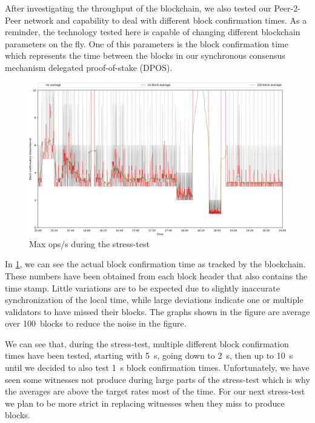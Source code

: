 After investigating the throughput of the blockchain, we also tested our
Peer-2-Peer network and capability to deal with different block confirmation
times. As a reminder, the technology tested here is capable of changing
different blockchain parameters on the fly. One of this parameters is the block
confirmation time which represents the time between the blocks in our
synchronous consensus mechanism delegated proof-of-stake (DPOS).

\begin{figure}[!htp]
 \centering
 \includegraphics[width=\linewidth]{figures/stress-test-block-time-full.png}
 \caption{Max ops/s during the stress-test}
 \label{fig:time-full}
\end{figure}

In \cref{fig:time-full}, we can see the actual block confirmation time as
tracked by the blockchain. These numbers have been obtained from each block
header that also contains the time stamp. Little variations are to be expected
due to slightly inaccurate synchronization of the local time, while large
deviations indicate one or multiple validators to have missed their blocks. The
graphs shown in the figure are average over \SI{100}{blocks} to reduce the
noise in the figure.

We can see that, during the stress-test, multiple different block confirmation
times have been tested, starting with \SI{5}{s}, going down to \SI{2}{s}, then
up to \SI{10}{s} until we decided to also test \SI{1}{s} block confirmation
times. Unfortunately, we have seen some witnesses not produce during large
parts of the stress-test which is why the averages are above the target rates
most of the time. For our next stress-test we plan to be more strict in
replacing witnesses when they miss to produce blocks.

